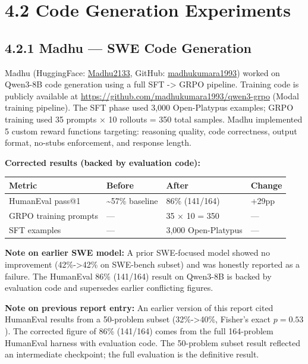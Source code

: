 \documentclass[
  american,
  11pt,
  a4paper,
  oneside]{report}
\newcounter{none} %
\begin{document}
\section{4.2 Code Generation
Experiments}\label{code-generation-experiments}

\subsection{4.2.1 Madhu --- SWE Code
Generation}\label{madhu-swe-code-generation}

Madhu (HuggingFace: \href{https://huggingface.co/Madhu2133}{Madhu2133},
GitHub: \href{https://github.com/madhukumara1993}{madhukumara1993})
worked on Qwen3-8B code generation using a full SFT -\textgreater{} GRPO
pipeline. Training code is publicly available at
\url{https://github.com/madhukumara1993/qwen3-grpo} (Modal training
pipeline). The SFT phase used 3,000 Open-Platypus examples; GRPO
training used 35 prompts × 10 rollouts = 350 total samples. Madhu
implemented 5 custom reward functions targeting: reasoning quality, code
correctness, output format, no-stubs enforcement, and response length.

\textbf{Corrected results (backed by evaluation code):}

{\def\LTcaptype{none} %
\begin{longtable}[]{@{}llll@{}}
\toprule\noalign{}
Metric & Before & After & Change \\
\midrule\noalign{}
\endhead
\bottomrule\noalign{}
\endlastfoot
HumanEval pass@1 & \textasciitilde57\% baseline & 86\% (141/164) &
+29pp \\
GRPO training prompts & --- & 35 × 10 = 350 & --- \\
SFT examples & --- & 3,000 Open-Platypus & --- \\
\end{longtable}
}

\textbf{Note on earlier SWE model:} A prior SWE-focused model showed no
improvement (42\%-\textgreater42\% on SWE-bench subset) and was honestly
reported as a failure. The HumanEval 86\% (141/164) result on Qwen3-8B
is backed by evaluation code and supersedes earlier conflicting figures.

\textbf{Note on previous report entry:} An earlier version of this
report cited HumanEval results from a 50-problem subset
(32\%-\textgreater40\%, Fisher's exact \(p{=}0.53\)). The corrected
figure of 86\% (141/164) comes from the full 164-problem HumanEval
harness with evaluation code. The 50-problem subset result reflected an
intermediate checkpoint; the full evaluation is the definitive result.
\end{document}
